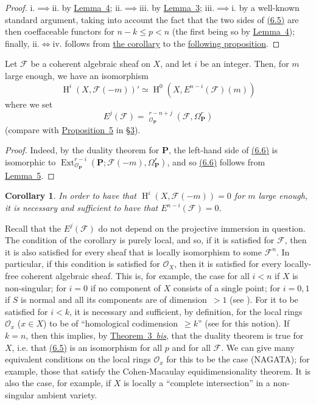 \documentclass{article}
\theoremstyle{plain}
\newenvironment{proposition}[1]
  {\renewcommand\theinnerproposition{#1}\innerproposition}
  {\endinnerproposition}
\newtheorem*{corollary*}{Corollary}
\theoremstyle{definition}
\newcommand{\scr}[1]{{\mathscr{#1}}}
\newcommand{\bb}{\mathbf}
\renewcommand{\geq}{\geqslant}
\renewcommand{\leq}{\leqslant}
\DeclareMathOperator{\Ext}{Ext}
\DeclareMathOperator{\shExt}{\underline{Ext}}
\DeclareMathOperator{\HH}{H}
\newcommand{\oldpage}[1]{\marginpar{\footnotesize$\Big\vert$ \textit{p.~#1}}}
\begin{document}
\begin{proof}
  i.$\implies$ii. by \hyperref[lemma4]{Lemma~4};
  ii.$\implies$iii. by \hyperref[lemma3]{Lemma~3};
  iii.$\implies$i. by a well-known standard argument, taking into account the fact that the two sides of \hyperref[6.5]{(6.5)} are then coeffaceable functors for $n-k\leq p< n$ (the first being so by \hyperref[lemma4]{Lemma~4});
  finally, ii.$\iff$iv. follows from \hyperref[proposition6corollary]{the corollary} to the \hyperref[proposition6]{following proposition}.
\end{proof}

\begin{proposition}{6}
\label{proposition6}
  Let $\scr{F}$ be a coherent algebraic sheaf on $X$, and let $i$ be an integer.
  Then, for $m$ large enough, we have an isomorphism
  \[
  \label{6.6}
    \HH^i(X,\scr{F}(-m))' \simeq \HH^0(X,E^{n-i}(\scr{F})(m))
  \tag{6.6}
  \]
  where we set
  \[
  \label{6.7}
    E^j(\scr{F}) = \shExt_{\scr{O}_\bb{P}}^{r-n+j}(\scr{F},\Omega_\bb{P}^r)
  \tag{6.7}
  \]
  (compare with \hyperref[proposition5]{Proposition~5} in \hyperref[section3]{\S3}).
\end{proposition}

\begin{proof}
  Indeed, by the duality theorem for $\bb{P}$, the left-hand side of \hyperref[6.6]{(6.6)} is isomorphic to $\Ext_{\scr{O}_\bb{P}}^{r-i}(\bb{P};\scr{F}(-m),\Omega_\bb{P}^r)$, and so \hyperref[6.6]{(6.6)} follows from \hyperref[lemma5]{Lemma~5}.
\end{proof}

\oldpage{149-19}
\begin{corollary*}
\label{proposition6corollary}
  In order to have that $\HH^i(X,\scr{F}(-m))=0$ for $m$ large enough, it is necessary and sufficient to have that $E^{n-i}(\scr{F})=0$.
\end{corollary*}

Recall that the $E^j(\scr{F})$ do not depend on the projective immersion in question.
The condition of the corollary is purely local, and so, if it is satisfied for $\scr{F}$, then it is also satisfied for every sheaf that is locally isomorphism to some $\scr{F}^n$.
In particular, if this condition is satisfied for $\scr{O}_X$, then it is satisfied for every locally-free coherent algebraic sheaf.
This is, for example, the case for all $i<n$ if $X$ is non-singular; for $i=0$ if no component of $X$ consists of a single point; for $i=0,1$ if $S$ is normal and all its components are of dimension~$>1$ (see \cite{3}).
For it to be satisfied for $i<k$, it is necessary and sufficient, by definition, for the local rings $\scr{O}_x$ ($x\in X$) to be of ``homological codimension~$\geq k$'' (see \cite{4} for this notion).
If $k=n$, then this implies, by \hyperref[theorem3bis]{Theorem~3~\emph{bis}}, that the duality theorem is true for $X$, i.e. that \hyperref[6.5]{(6.5)} is an isomorphism for all $p$ and for all $\scr{F}$.
We can give many equivalent conditions on the local rings $\scr{O}_x$ for this to be the case (NAGATA);
for example, those that satisfy the Cohen-Macaulay equidimensionality theorem.
It is also the case, for example, if $X$ is locally a ``complete intersection'' in a non-singular ambient variety.
\end{document}
